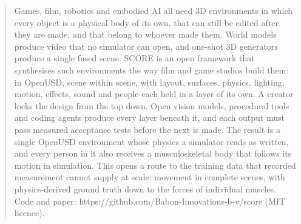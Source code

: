 \begin{abstract}
Games, film, robotics and embodied AI all need 3D environments in which
every object is a physical body of its own, that can still be edited
after they are made, and that belong to whoever made them. World models
produce video that no simulator can open, and one-shot 3D generators
produce a single fused scene. SCORE is an open framework that
synthesises such environments the way film and game studios build them:
in OpenUSD, scene within scene, with layout, surfaces, physics,
lighting, motion, effects, sound and people each held in a layer of its
own. A creator locks the design from the top down. Open vision models,
procedural tools and coding agents produce every layer beneath it, and
each output must pass measured acceptance tests before the next is made.
The result is a single OpenUSD environment whose physics a simulator
reads as written, and every person in it also receives a musculoskeletal
body that follows its motion in simulation. This opens a route to the
training data that recorded measurement cannot supply at scale: movement
in complete scenes, with physics-derived ground truth down to the forces
of individual muscles. Code and paper:
https://github.com/Babon-Innovations-b-v/score (MIT licence).
\end{abstract}
